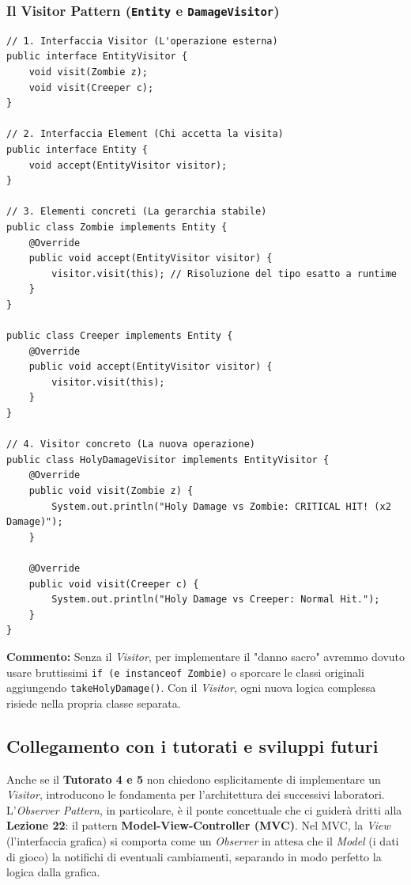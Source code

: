 \documentclass[12pt, a4paper]{article}
\begin{document}
\subsubsection{Il Visitor Pattern (\texttt{Entity} e \texttt{DamageVisitor})}
\begin{verbatim}
// 1. Interfaccia Visitor (L'operazione esterna)
public interface EntityVisitor {
    void visit(Zombie z);
    void visit(Creeper c);
}

// 2. Interfaccia Element (Chi accetta la visita)
public interface Entity {
    void accept(EntityVisitor visitor);
}

// 3. Elementi concreti (La gerarchia stabile)
public class Zombie implements Entity {
    @Override
    public void accept(EntityVisitor visitor) {
        visitor.visit(this); // Risoluzione del tipo esatto a runtime
    }
}

public class Creeper implements Entity {
    @Override
    public void accept(EntityVisitor visitor) {
        visitor.visit(this);
    }
}

// 4. Visitor concreto (La nuova operazione)
public class HolyDamageVisitor implements EntityVisitor {
    @Override
    public void visit(Zombie z) {
        System.out.println("Holy Damage vs Zombie: CRITICAL HIT! (x2 Damage)");
    }

    @Override
    public void visit(Creeper c) {
        System.out.println("Holy Damage vs Creeper: Normal Hit.");
    }
}
\end{verbatim}
\textbf{Commento:} Senza il \textit{Visitor}, per implementare il "danno sacro" avremmo dovuto usare bruttissimi \texttt{if (e instanceof Zombie)} o sporcare le classi originali aggiungendo \texttt{takeHolyDamage()}. Con il \textit{Visitor}, ogni nuova logica complessa risiede nella propria classe separata.

\subsection{Collegamento con i tutorati e sviluppi futuri}
Anche se il \textbf{Tutorato 4 e 5} non chiedono esplicitamente di implementare un \textit{Visitor}, introducono le fondamenta per l'architettura dei successivi laboratori. L'\textit{Observer Pattern}, in particolare, è il ponte concettuale che ci guiderà dritti alla \textbf{Lezione 22}: il pattern \textbf{Model-View-Controller (MVC)}. Nel MVC, la \textit{View} (l'interfaccia grafica) si comporta come un \textit{Observer} in attesa che il \textit{Model} (i dati di gioco) la notifichi di eventuali cambiamenti, separando in modo perfetto la logica dalla grafica.
\end{document}
